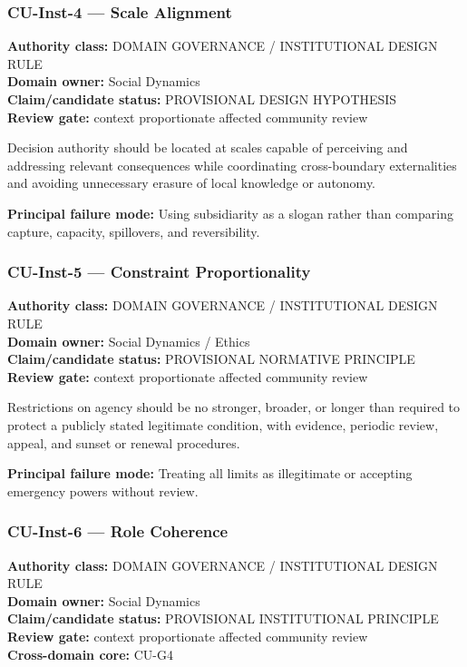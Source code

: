 \documentclass[
  11pt,
]{article}
\begin{document}
\subsubsection{CU-Inst-4 --- Scale
Alignment}\label{cu-inst-4-scale-alignment}

\textbf{Authority class:} DOMAIN GOVERNANCE / INSTITUTIONAL DESIGN
RULE\\
\textbf{Domain owner:} Social Dynamics\\
\textbf{Claim/candidate status:} PROVISIONAL DESIGN HYPOTHESIS\\
\textbf{Review gate:} context proportionate affected community review

Decision authority should be located at scales capable of perceiving and
addressing relevant consequences while coordinating cross-boundary
externalities and avoiding unnecessary erasure of local knowledge or
autonomy.

\textbf{Principal failure mode:} Using subsidiarity as a slogan rather
than comparing capture, capacity, spillovers, and reversibility.

\subsubsection{CU-Inst-5 --- Constraint
Proportionality}\label{cu-inst-5-constraint-proportionality}

\textbf{Authority class:} DOMAIN GOVERNANCE / INSTITUTIONAL DESIGN
RULE\\
\textbf{Domain owner:} Social Dynamics / Ethics\\
\textbf{Claim/candidate status:} PROVISIONAL NORMATIVE PRINCIPLE\\
\textbf{Review gate:} context proportionate affected community review

Restrictions on agency should be no stronger, broader, or longer than
required to protect a publicly stated legitimate condition, with
evidence, periodic review, appeal, and sunset or renewal procedures.

\textbf{Principal failure mode:} Treating all limits as illegitimate or
accepting emergency powers without review.

\subsubsection{CU-Inst-6 --- Role
Coherence}\label{cu-inst-6-role-coherence}

\textbf{Authority class:} DOMAIN GOVERNANCE / INSTITUTIONAL DESIGN
RULE\\
\textbf{Domain owner:} Social Dynamics\\
\textbf{Claim/candidate status:} PROVISIONAL INSTITUTIONAL PRINCIPLE\\
\textbf{Review gate:} context proportionate affected community review\\
\textbf{Cross-domain core:} CU-G4
\end{document}
